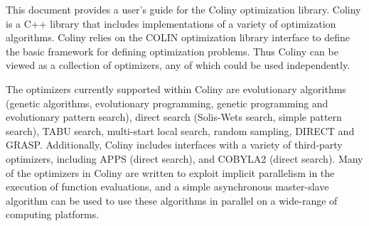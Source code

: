 This document provides a user's guide for the Coliny optimization library.
Coliny is a C++ library that includes implementations of a variety of
optimization algorithms. Coliny relies on the COLIN optimization library
interface to define the basic framework for defining optimization
problems.  Thus Coliny can be viewed as a collection of optimizers,
any of which could be used independently.

The optimizers currently supported within Coliny are evolutionary
algorithms (genetic algorithms, evolutionary programming, genetic
programming and evolutionary pattern search), direct search (Solis-Wets
search, simple pattern search), TABU search, multi-start local search,
random sampling, DIRECT and GRASP.  Additionally, Coliny includes
interfaces with a variety of third-party optimizers, including APPS
(direct search), and COBYLA2 (direct search).  Many of the optimizers in
Coliny are written to exploit implicit parallelism in the execution of
function evaluations, and a simple asynchronous master-slave algorithm
can be used to use these algorithms in parallel on a wide-range of
computing platforms.
